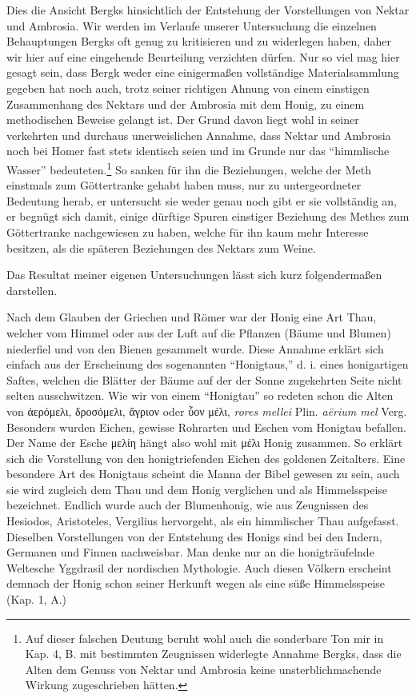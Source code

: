 \documentclass[a4paper, 11pt, oneside]{article}
\begin{document}
Dies die Ansicht Bergks hinsichtlich der Entstehung der Vorstellungen von Nektar und Ambrosia. Wir werden im Verlaufe unserer Untersuchung die einzelnen Behauptungen Bergks oft genug zu kritisieren und zu widerlegen haben, daher wir hier auf eine eingehende Beurteilung verzichten dürfen. Nur so viel mag hier gesagt sein, dass Bergk weder eine einigermaßen vollständige Materialsammlung gegeben hat noch auch, trotz seiner richtigen Ahnung von einem einstigen Zusammenhang des Nektars und der Ambrosia mit dem Honig, zu einem methodischen Beweise gelangt ist. Der Grund davon liegt wohl in seiner verkehrten und durchaus unerweislichen Annahme, dass Nektar und Ambrosia noch bei Homer fast stets identisch seien und im Grunde nur das "`himmlische Wasser"' bedeuteten.\footnote{Auf dieser falschen Deutung beruht wohl auch die sonderbare Ton mir in Kap. 4, B. mit bestimmten Zeugnissen widerlegte Annahme Bergks, dass die Alten dem Genuss von Nektar und Ambrosia keine unsterblichmachende Wirkung zugeschrieben hätten.} So sanken für ihn die Beziehungen, welche der Meth einstmals zum Göttertranke gehabt haben muss, nur zu untergeordneter Bedeutung herab, er untersucht sie weder genau noch gibt er sie vollständig an, er begnügt sich damit, einige dürftige Spuren einstiger Beziehung des Methes zum Göttertranke nachgewiesen zu haben, welche für ihn kaum mehr Interesse besitzen, als die späteren Beziehungen des Nektars zum Weine.

Das Resultat meiner eigenen Untersuchungen lässt sich kurz folgendermaßen darstellen.

Nach dem Glauben der Griechen und Römer war der Honig eine Art Thau, welcher vom Himmel oder aus der Luft auf die Pflanzen (Bäume und Blumen) niederfiel und von den Bienen gesammelt wurde. Diese Annahme erklärt sich einfach aus der Erscheinung des sogenannten "`Honigtaus,"' d. i. eines honigartigen Saftes, welchen die Blätter der Bäume auf der der Sonne zugekehrten Seite nicht selten ausschwitzen. Wie wir von einem "`Honigtau"' so redeten schon die Alten von ἀερόμελι, δροσόμελι, ἄγριον oder ὗον μέλι, \emph{rores mellei} Plin. \emph{aërium mel} Verg. Besonders wurden Eichen, gewisse Rohrarten und Eschen vom Honigtau befallen. Der Name der Esche μελίη hängt also wohl mit μέλι Honig zusammen. So erklärt sich die Vorstellung von den honigtriefenden Eichen des goldenen Zeitalters. Eine besondere Art des Honigtaus scheint die Manna der Bibel gewesen zu sein, auch sie wird zugleich dem Thau und dem Honig verglichen und als Himmelsspeise bezeichnet. Endlich wurde auch der Blumenhonig, wie aus Zeugnissen des Hesiodos, Aristoteles, Vergilius hervorgeht, als ein himmlischer Thau aufgefasst. Dieselben Vorstellungen von der Entstehung des Honigs sind bei den Indern, Germanen und Finnen nachweisbar. Man denke nur an die honigträufelnde Weltesche Yggdrasil der nordischen Mythologie. Auch diesen Völkern erscheint demnach der Honig schon seiner Herkunft wegen als eine süße Himmelsspeise (Kap. 1, A.)
\end{document}
